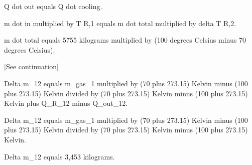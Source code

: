 Q dot out equals Q dot cooling.  

m dot in multiplied by T R,1 equals m dot total multiplied by delta T R,2.  

m dot total equals 5755 kilograms multiplied by (100 degrees Celsius minus 70 degrees Celsius).  

[See continuation]

Delta m_12 equals m_gas_1 multiplied by (70 plus 273.15) Kelvin minus (100 plus 273.15) Kelvin divided by (70 plus 273.15) Kelvin minus (100 plus 273.15) Kelvin plus Q_R_12 minus Q_out_12.  

Delta m_12 equals m_gas_1 multiplied by (70 plus 273.15) Kelvin minus (100 plus 273.15) Kelvin divided by (70 plus 273.15) Kelvin minus (100 plus 273.15) Kelvin.  

Delta m_12 equals 3,453 kilograms.